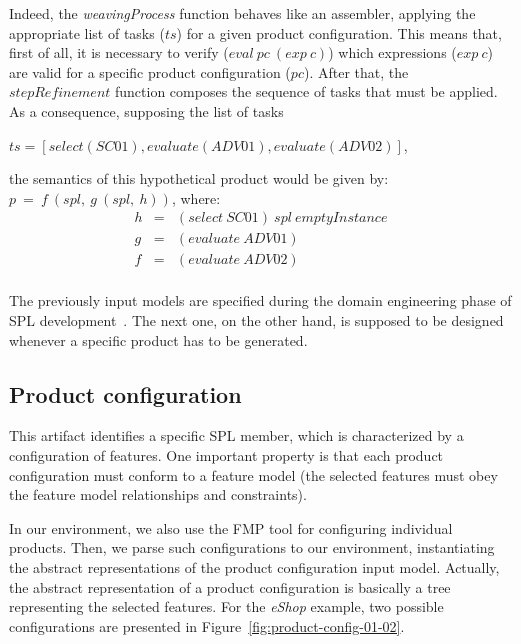 \documentclass{acm_proc_article-sp}
\begin{document}
Indeed, the \emph{weavingProcess} function behaves like an assembler, applying the appropriate list of tasks ($ts$) for a given product configuration. This means that, first of all, it is necessary to verify  ($eval\
pc\ (exp\ c)$) which expressions ($exp\ c$) are valid for a specific product
configuration ($pc$). After that, the $stepRefinement$ function composes the sequence of tasks that must be applied. As a consequence, supposing the list of tasks
 
$ts=[select(SC01),evaluate(ADV01),evaluate(ADV02)]$,
 
the semantics of this hypothetical product would be given by: $p\ =\  f\ (spl,\ g\ (spl,\ h))$, where:
\begin{eqnarray*}
h  & = & (select\ SC01)\ spl\ emptyInstance \\
g  & = & (evaluate\ ADV01) \\
f   & = & (evaluate\ ADV02) \\
\end{eqnarray*}

{\color{red}The previously input models are specified during the domain engineering phase of SPL development~\cite{Clements:2001aa,Pohl:2005aa}. The next one, on the other hand, is supposed to be designed whenever a specific product has to be generated. }

\subsection{Product configuration}\label{subsub:pc}

This artifact identifies a specific SPL member, which is characterized by a
configuration of features. One important property is that each product configuration must conform to a feature model (the selected features must obey the feature model relationships and constraints).

 {\color{red}In our environment, we also use the FMP tool 
for configuring individual products. Then, we parse such configurations to our 
environment, instantiating the abstract representations of the product configuration 
input model. Actually, the abstract representation of a product configuration is basically a 
tree representing the selected features.  
For the \emph{eShop} example, two possible configurations are
presented in Figure~\ref{fig:product-config-01-02}. }
\end{document}
